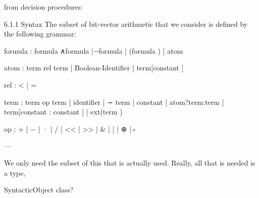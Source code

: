from decision procedures:

6.1.1 Syntax
The subset of bit-vector arithmetic that we consider is deﬁned by the following grammar: 

formula : formula ∧formula |¬formula | (formula ) | atom 

atom : term rel term | Boolean-Identiﬁer | term[constant ] 

rel : < | = 

term : term op term | identiﬁer | ∼ term | constant | atom?term:term | term[constant : constant ] | ext(term ) 

op : + | − | · | / | << | >> | & | | | ⊕ |◦ 

---

We only need the subset of this that is actually used.
Really, all that is needed is a type, 

SyntacticObject class?